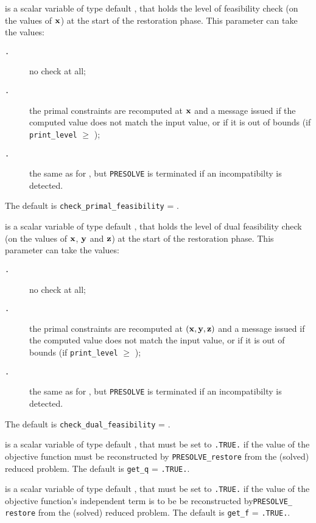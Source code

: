 \documentclass{galahad}
\newcommand{\packagename}{PRESOLVE}
\newcommand{\sym}{\tt\small}
\begin{document}
\begin{description}
 is a scalar variable of type default
\integer, that holds the level of feasibility check (on the values of ${\mathbf{x}}$)
at the start of the restoration phase.  This parameter can
take the values:
\begin{description}
\item[\sym \galsymnone.] no check at all;
\item[\sym \galsymbasic.] the primal constraints are recomputed at ${\mathbf{x}}$
             and a message issued if the computed value
             does not match the input value, or if it is
             out of bounds (if {\tt print\_level} $\geq$ {\sym \galsymaction});
\item[\sym \galsymsevere.] the same as for {\sym \galsymbasic}, but {\tt \packagename} is
              terminated if an incompatibilty is detected.
\end{description}
The default is {\tt check\_primal\_feasibility} = {\sym \galsymnone}.

 is a scalar variable of type default
\integer, that holds the level of dual feasibility check (on the values of
${\mathbf{x}}$, ${\mathbf{y}}$ and ${\mathbf{z}}$) at the start of the restoration phase.  This
parameter can take the values:
\begin{description}
\item[\sym \galsymnone.] no check at all;
\item[\sym \galsymbasic.] the primal constraints are recomputed at $({\mathbf{x}},{\mathbf{y}},{\mathbf{z}})$
             and a message issued if the computed value
             does not match the input value, or if it is
             out of bounds (if {\tt print\_level} $\geq$ {\sym \galsymaction});
\item[\sym \galsymsevere.] the same as for {\sym \galsymbasic}, but {\tt \packagename} is
              terminated if an incompatibilty is detected.
\end{description}
The default is {\tt check\_dual\_feasibility} = {\sym \galsymnone}.

 is a scalar variable of type default \logical, that
must be set to {\tt .TRUE.} if the value of the objective
function must be reconstructed by {\tt \packagename\_restore} from the
(solved) reduced problem.
The default is {\tt get\_q} = {\tt .TRUE.}.

 is a scalar variable of type default \logical, that
must be set to {\tt .TRUE.} if the value of the objective
function's independent term is to be be reconstructed
by{\tt \packagename\_ restore} from the (solved) reduced problem.
The default is {\tt get\_f} = {\tt .TRUE.}.


\end{description}
\end{document}

